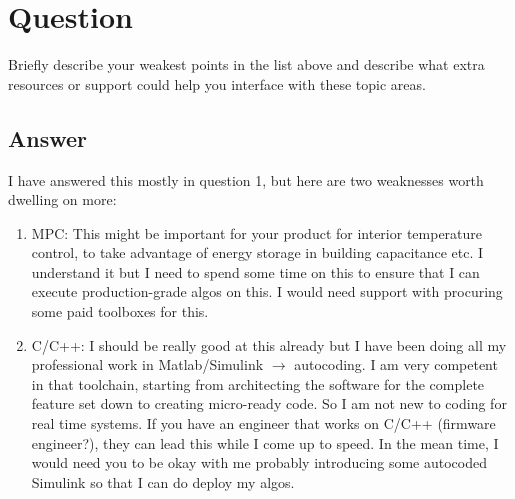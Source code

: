 \section{Question}
Briefly describe your weakest points in the list above and describe what extra resources
or support could help you interface with these topic areas.

\subsection *{Answer}

I have answered this mostly in question 1, but here are two weaknesses worth dwelling on more:
\begin{enumerate}
  \item MPC: This might be important for your product for interior temperature control, to take advantage of energy storage in building capacitance etc. I understand it but I need to spend some time on this to ensure that I can execute production-grade algos on this. I would need support with procuring some paid toolboxes for this.
  \item C/C++: I should be really good at this already but I have been doing all my professional work in Matlab/Simulink \(\rightarrow\) autocoding. I am very competent in that toolchain, starting from architecting the software for the complete feature set down to creating micro-ready code. So I am not new to coding for real time systems. If you have an engineer that works on C/C++ (firmware engineer?), they can lead this while I come up to speed. In the mean time, I would need you to be okay with me probably introducing some autocoded Simulink so that I can do deploy my algos.
\end{enumerate}